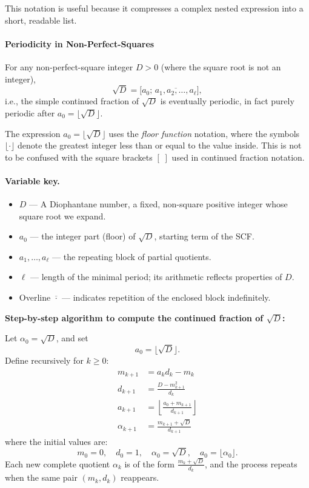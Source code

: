 \documentclass[11pt]{article}
\begin{document}
This notation is useful because it compresses a complex nested expression into a short, readable list.

\paragraph{Periodicity in Non-Perfect-Squares}
For any non-perfect-square integer $D>0$ (where the square root is not an integer),
\[
\sqrt{D}=\bigl[a_0;\,\overline{a_1,a_2,\dots,a_\ell}\bigr],
\]
i.e., the simple continued fraction of $\sqrt{D}$ is eventually periodic, in fact purely periodic after $a_0=\lfloor\sqrt{D}\rfloor$.

\smallskip
\noindent
The expression $a_0 = \lfloor \sqrt{D} \rfloor$ uses the \emph{floor function} notation, where the symbols $\lfloor \cdot \rfloor$ denote the greatest integer less than or equal to the value inside. This is not to be confused with the square brackets $[\;]$ used in continued fraction notation.

\paragraph{Variable key.}
\begin{itemize}
  \item $D$ — A Diophantane number, a fixed, non-square positive integer whose square root we expand.
  \item $a_0$ — the integer part (floor) of $\sqrt{D}$, starting term of the SCF.
  \item $a_1,\dots,a_\ell$ — the repeating block of partial quotients.
  \item $\ell$ — length of the minimal period; its arithmetic reflects properties of $D$.
  \item Overline $\overline{\cdot}$ — indicates repetition of the enclosed block indefinitely.
\end{itemize}

\smallskip
\noindent
\textbf{Step-by-step algorithm to compute the continued fraction of \( \sqrt{D} \):}

Let \( \alpha_0 = \sqrt{D} \), and set
\[
a_0 = \lfloor \sqrt{D} \rfloor.
\]
Define recursively for \( k \geq 0 \):
\begin{align*}
m_{k+1} &= a_k d_k - m_k \\
d_{k+1} &= \frac{D - m_{k+1}^2}{d_k} \\
a_{k+1} &= \left\lfloor \frac{a_0 + m_{k+1}}{d_{k+1}} \right\rfloor \\
\alpha_{k+1} &= \frac{m_{k+1} + \sqrt{D}}{d_{k+1}}
\end{align*}
where the initial values are:
\[
m_0 = 0, \quad d_0 = 1, \quad \alpha_0 = \sqrt{D}, \quad a_0 = \lfloor \alpha_0 \rfloor.
\]
Each new complete quotient \( \alpha_k \) is of the form \( \frac{m_k + \sqrt{D}}{d_k} \), and the process repeats when the same pair \( (m_k, d_k) \) reappears.
\end{document}
